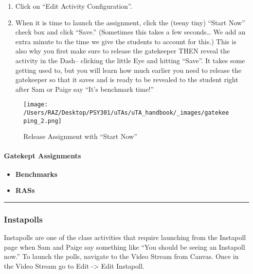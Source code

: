 \documentclass[
]{article}
\providecommand{\tightlist}{%
  \setlength{\itemsep}{0pt}\setlength{\parskip}{0pt}}
\begin{document}
\begin{enumerate}
\def\labelenumi{\arabic{enumi}.}
\setcounter{enumi}{2}
\item
  Click on ``Edit Activity Configuration''.
\item
  When it is time to launch the assignment, click the (teeny tiny) ``Start Now'' check box and click ``Save.'' (Sometimes this takes a few seconds\ldots{} We add an extra minute to the time we give the students to account for this.) This is also why you first make sure to release the gatekeeper THEN reveal the activity in the Dash-- clicking the little Eye and hitting ``Save''. It takes some getting used to, but you will learn how much earlier you need to release the gatekeeper so that it saves and is ready to be revealed to the student right after Sam or Paige say ``It's benchmark time!''
\end{enumerate}

\begin{figure}
\centering
\texttt{[image: /Users/RAZ/Desktop/PSY301/uTAs/uTA\_handbook/\_images/gatekeeping\_2.png]}
\caption{Release Assignment with ``Start Now''}
\end{figure}

\hypertarget{gatekept-assignments}{%
\paragraph{Gatekept Assignments}\label{gatekept-assignments}}

\begin{itemize}
\tightlist
\item
  \textbf{Benchmarks}
\item
  \textbf{RASs}
\end{itemize}

\begin{center}\rule{0.5\linewidth}{0.5pt}\end{center}

\hypertarget{instapolls}{%
\subsubsection{Instapolls}\label{instapolls}}

Instapolls are one of the class activities that require launching from the Instapoll page when Sam and Paige say something like ``You should be seeing an Instapoll now.'' To launch the polls, navigate to the Video Stream from Canvas. Once in the Video Stream go to Edit -\textgreater{} Edit Instapoll.
\end{document}
